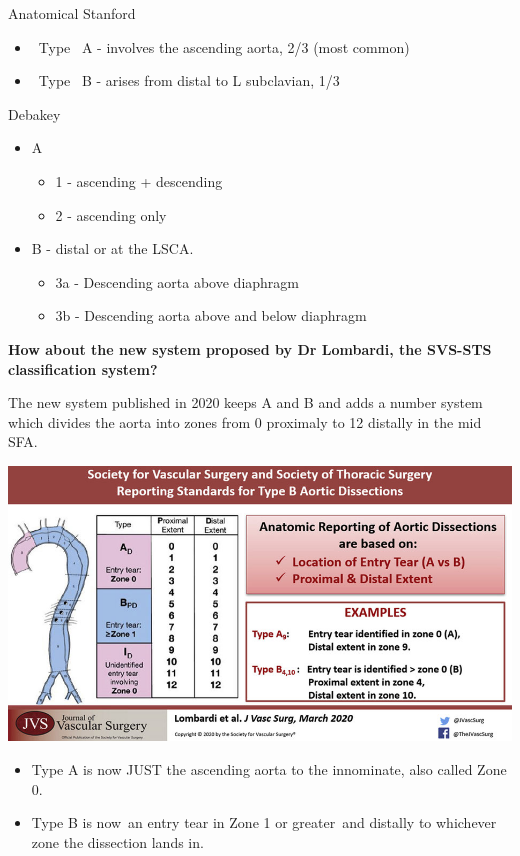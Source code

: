 \documentclass[
]{book}
\begin{document}
Anatomical Stanford

\begin{itemize}
\item
  ~Type~ A - involves the ascending aorta, 2/3 (most common)
\item
  ~Type~ B - arises from distal to L subclavian, 1/3
\end{itemize}

Debakey

\begin{itemize}
\item
  A

  \begin{itemize}
  \item
    1 - ascending + descending
  \item
    2 - ascending only
  \end{itemize}
\item
  B - distal or at the LSCA.

  \begin{itemize}
  \item
    3a - Descending aorta above diaphragm
  \item
    3b - Descending aorta above and below diaphragm
  \end{itemize}
\end{itemize}

\textbf{How about the new system proposed by Dr Lombardi, the SVS-STS
classification system?}

The new system published in 2020 keeps A and B and adds a number system
which divides the aorta into zones from 0 proximaly to 12 distally in
the mid SFA. \citep{lombardiSocietyVascularSurgery2020}

\includegraphics[width=13.06in]{images/thoracic_dissection1}

\begin{itemize}
\item
  Type A is now JUST the ascending aorta to the innominate, also
  called Zone 0.~
\item
  Type B is now~an entry tear in Zone 1 or greater~and distally to
  whichever zone the dissection lands in.
\end{itemize}
\end{document}

